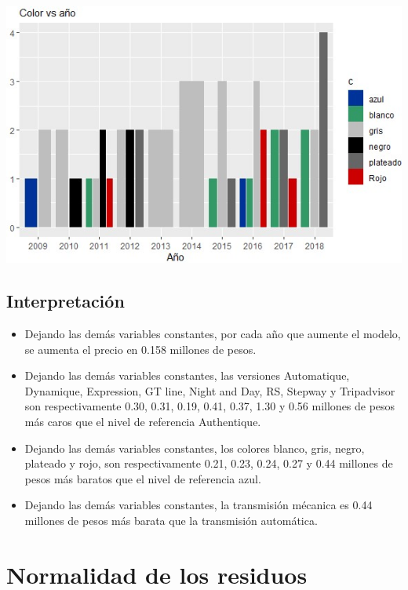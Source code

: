 \documentclass[12pt,a0,portrait]{a0poster}
\begin{document}
\begin{multicols}{2}
\begin{center}
	\includegraphics[scale=1.5]{Colorvsa}
\end{center} 

\subsection*{\textcolor{ginger}{Interpretaci\'on}}

\begin{itemize}
	\item Dejando las dem\'as variables constantes, por cada a\~no que aumente el modelo, se aumenta el precio en 0.158 millones de pesos.
	\item Dejando las dem\'as variables constantes, las versiones Automatique, Dynamique, Expression, GT line, Night and Day, RS, Stepway y Tripadvisor son respectivamente 0.30, 0.31, 0.19, 0.41, 0.37, 1.30  y 0.56 millones de pesos m\'as caros que el nivel de referencia  Authentique.
	\item Dejando las dem\'as variables constantes, los colores blanco, gris, negro, plateado y rojo, son  respectivamente 0.21, 0.23, 0.24, 0.27 y  0.44 millones de pesos m\'as baratos que el nivel de referencia azul.
	\item Dejando las dem\'as variables constantes, la transmisi\'on m\'ecanica es 0.44 millones de pesos m\'as barata que la transmisi\'on autom\'atica. 
	
\end{itemize}
\section*{\textcolor{ginger}{\huge Normalidad de los residuos}}


\end{multicols}
\end{document}
